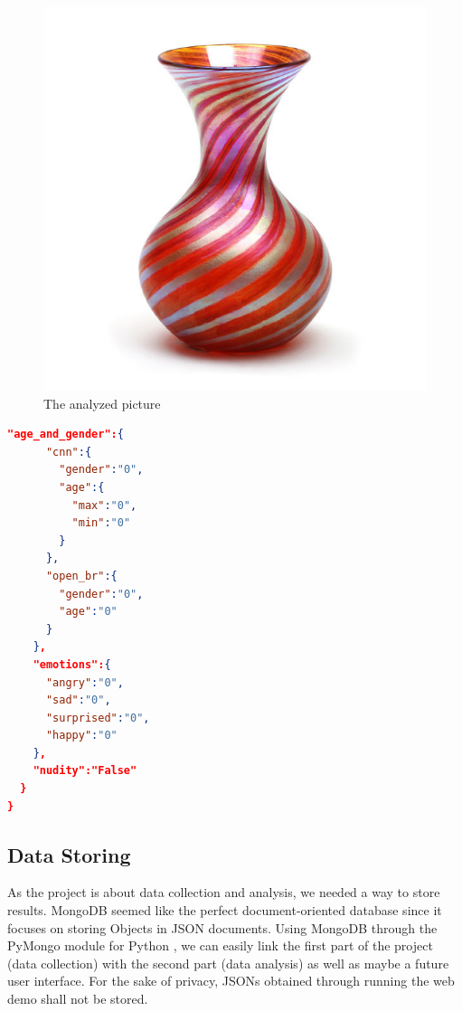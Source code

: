\documentclass{article}
\begin{document}
    \begin{figure}
      \begin{center}
       \includegraphics[scale=0.15]{vase.jpg}
      \end{center}
      \caption{The analyzed picture}
    \end{figure}
  \begin{lstlisting}[language=json,firstnumber=1]
    "age_and_gender":{
      "cnn":{
        "gender":"0",
        "age":{
          "max":"0",
          "min":"0"
        }
      },
      "open_br":{
        "gender":"0",
        "age":"0"
      }
    },
    "emotions":{
      "angry":"0",
      "sad":"0",
      "surprised":"0",
      "happy":"0"
    },
    "nudity":"False"
  }
}
        \end{lstlisting}
    \subsection{Data Storing}
        As the project is about data collection and analysis, we needed a way to store results. MongoDB \cite{mongo} seemed like the perfect document-oriented database since it focuses on storing Objects in JSON documents. Using MongoDB through the PyMongo module for Python \cite{pym}, we can easily link the first part of the project (data collection) with the second part (data analysis) as well as maybe a future user interface. 
        For the sake of privacy, JSONs obtained through running the web demo shall not be stored.
\end{document}
